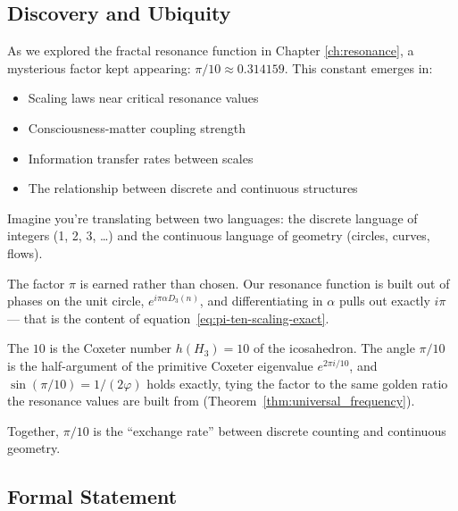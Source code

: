 \subsection{Discovery and Ubiquity}

As we explored the fractal resonance function in Chapter \ref{ch:resonance}, a mysterious factor kept appearing: $\pi/10 \approx 0.314159$. This constant emerges in:

\begin{itemize}
\item Scaling laws near critical resonance values
\item Consciousness-matter coupling strength
\item Information transfer rates between scales
\item The relationship between discrete and continuous structures
\end{itemize}

\begin{intuitive}[Why $\pi/10$?]
Imagine you're translating between two languages: the discrete language of
integers (1, 2, 3, \ldots) and the continuous language of geometry (circles,
curves, flows).

The factor $\pi$ is earned rather than chosen. Our resonance function is built
out of phases on the unit circle, $e^{i\pi\alpha D_3(n)}$, and differentiating in
$\alpha$ pulls out exactly $i\pi$ --- that is the content of
equation~\eqref{eq:pi-ten-scaling-exact}.

The $10$ is the Coxeter number $h(H_3) = 10$ of the icosahedron. The angle
$\pi/10$ is the half-argument of the primitive Coxeter eigenvalue
$e^{2\pi i/10}$, and $\sin(\pi/10) = 1/(2\varphi)$ holds exactly, tying the
factor to the same golden ratio the resonance values are built from
(Theorem~\ref{thm:universal_frequency}).

Together, $\pi/10$ is the ``exchange rate'' between discrete counting and
continuous geometry.
\end{intuitive}

\subsection{Formal Statement}

